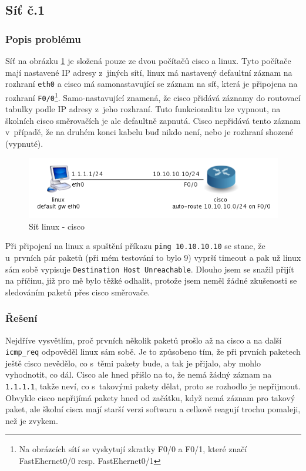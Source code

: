 
\subsection{Síť č.1}
\subsubsection{Popis problému}
Síť na obrázku \ref{fig:sit_2pc} je složená pouze ze dvou počítačů cisco a linux. Tyto počítače mají nastavené IP adresy z~jiných sítí, linux má nastavený defaultní záznam na rozhraní \verb|eth0| a cisco má samonastavující se záznam na síť, která je připojena na rozhraní \verb|F0/0|\footnote{Na obrázcích sítí se vyskytují zkratky F0/0 a F0/1, které značí FastEhernet0/0 resp. FastEhernet0/1}. Samo-nastavující znamená, že cisco přidává záznamy do routovací tabulky podle IP adresy z~jeho rozhraní. Tuto funkcionalitu lze vypnout, na školních cisco směrovačích je ale defaultně zapnutá. Cisco nepřidává tento záznam v~případě, že na druhém konci kabelu buď nikdo není, nebo je rozhraní shozené (vypnuté).

\begin{figure}[h]
\begin{center}
\includegraphics[width=13cm]{figures/sit_2pc.png}
\caption{Síť linux - cisco}
\label{fig:sit_2pc}
\end{center}
\end{figure}

Při připojení na linux a spuštění příkazu \verb|ping 10.10.10.10| se stane, že u~prvních pár paketů (při mém testování to bylo 9) vyprší timeout a pak už linux sám sobě vypisuje \verb|Destination Host Unreachable|. Dlouho jsem se snažil přijít na příčinu, již pro mě bylo těžké odhalit, protože jsem neměl žádné zkušenosti se sledováním paketů přes cisco směrovače. 

\subsubsection{Řešení} 
Nejdříve vysvětlím, proč prvních několik paketů prošlo až na cisco a na další \verb|icmp_req| odpověděl linux sám sobě. Je to způsobeno tím, že při prvních paketech ještě cisco nevědělo, co s~těmi pakety bude, a tak je přijalo, aby mohlo vyhodnotit, co dál. Cisco ale hned přišlo na to, že nemá žádný záznam na \verb|1.1.1.1|, takže neví, co s~takovými pakety dělat, proto se rozhodlo je nepřijmout. Obvykle cisco nepřijímá pakety hned od začátku, když nemá záznam pro takový paket, ale školní cisca mají starší verzi softwaru a celkově reagují trochu pomaleji, než je zvykem.

